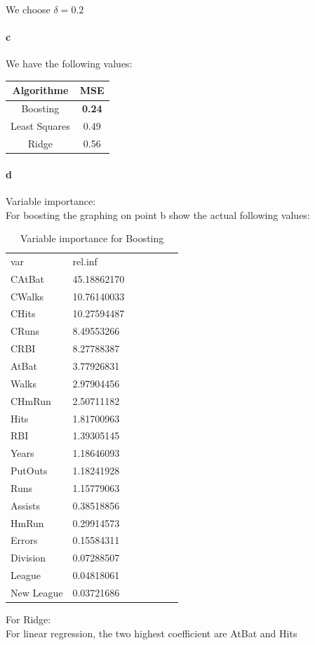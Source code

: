 We choose $\delta = 0.2 $ 


\paragraph{c} We have the following values: \\

\begin{tabular}{|c|c|}
	\hline 
	Algorithme & MSE \\ 
	\hline 
	Boosting & \textbf{0.24} \\ 
	\hline 
	Least Squares & 0.49 \\ 
	\hline 
	Ridge & 0.56 \\ 
	\hline 
\end{tabular} 


 
\paragraph{d} Variable importance: \\

For boosting the graphing on point b show the actual following values: \\

\begin{table}[]
	\centering
	\caption{Variable importance for Boosting}
	\label{my-label}
	\begin{tabular}{lllllll}
		var        & rel.inf     &  &  &  &  &  \\
		CAtBat     & 45.18862170 &  &  &  &  &  \\
		CWalks     & 10.76140033 &  &  &  &  &  \\
		CHits      & 10.27594487 &  &  &  &  &  \\
		CRuns      & 8.49553266  &  &  &  &  &  \\
		CRBI       & 8.27788387  &  &  &  &  &  \\
		AtBat      & 3.77926831  &  &  &  &  &  \\
		Walks      & 2.97904456  &  &  &  &  &  \\
		CHmRun     & 2.50711182  &  &  &  &  &  \\
		Hits       & 1.81700963  &  &  &  &  &  \\
		RBI        & 1.39305145  &  &  &  &  &  \\
		Years      & 1.18646093  &  &  &  &  &  \\
		PutOuts    & 1.18241928  &  &  &  &  &  \\
		Runs       & 1.15779063  &  &  &  &  &  \\
		Assists    & 0.38518856  &  &  &  &  &  \\
		HmRun      & 0.29914573  &  &  &  &  &  \\
		Errors     & 0.15584311  &  &  &  &  &  \\
		Division   & 0.07288507  &  &  &  &  &  \\
		League     & 0.04818061  &  &  &  &  &  \\
		New League & 0.03721686  &  &  &  &  & 
	\end{tabular}
\end{table}

For Ridge: \\




For linear regression, the two highest coefficient are AtBat and Hits

